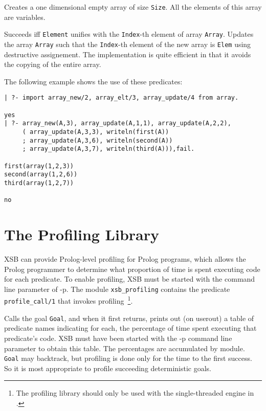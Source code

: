 \begin{description}
%
Creates a one dimensional empty array of size {\tt Size}.  All the
elements of this array are variables.  

  
%
Succeeds iff {\tt Element} unifies with the {\tt Index}-th element of
array {\tt Array}.  
%
  
%
Updates the array {\tt Array} such that the {\tt Index}-th element of
the new array is {\tt Elem} using destructive assignement.  The
implementation is quite efficient in that it avoids the copying of the
entire array.
\end{description}

The following example shows the use of these predicates:
{\footnotesize
\begin{verbatim}
| ?- import array_new/2, array_elt/3, array_update/4 from array.

yes
| ?- array_new(A,3), array_update(A,1,1), array_update(A,2,2),
     ( array_update(A,3,3), writeln(first(A))
     ; array_update(A,3,6), writeln(second(A))
     ; array_update(A,3,7), writeln(third(A))),fail.

first(array(1,2,3))
second(array(1,2,6))
third(array(1,2,7))

no
\end{verbatim}
}

\section{The Profiling Library} \label{sec:profile}

XSB can provide Prolog-level profiling for Prolog programs, which
allows the Prolog programmer to determine what proportion of time is
spent executing code for each predicate.  To enable profiling, XSB
must be started with the command line parameter of -p.  The module
{\tt xsb\_profiling} contains the predicate {\tt profile\_call/1} that
invokes profiling~\footnote{The profiling library should only be used
  with the single-threaded engine in \version{}.}.

\begin{description}

Calls the goal {\tt Goal}, and when it first returns, prints out (on
userout) a table of predicate names indicating for each, the
percentage of time spent executing that predicate's code.  XSB must
have been started with the -p command line parameter to obtain this
table.  The percentages are accumulated by module.  {\tt Goal} may
backtrack, but profiling is done only for the time to the first
success.  So it is most appropriate to profile succeeding
deterministic goals.
\end{description}

